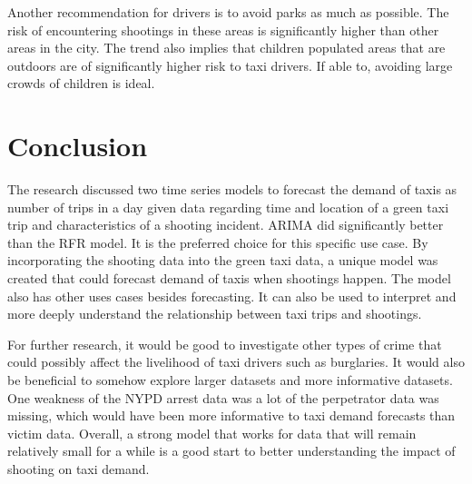 \documentclass[11pt]{article}
\begin{document}
Another recommendation for drivers is to avoid parks as much as possible. The risk of encountering shootings in these areas is significantly higher than other areas in the city. The trend also implies that children populated areas that are outdoors are of significantly higher risk to taxi drivers. If able to, avoiding large crowds of children is ideal.

\section{Conclusion}
The research discussed two time series models to forecast the demand of taxis as number of trips in a day given data regarding time and location of a green taxi trip and characteristics of a shooting incident. ARIMA did significantly better than the RFR model. It is the preferred choice for this specific use case. By incorporating the shooting data into the green taxi data, a unique model was created that could forecast demand of taxis when shootings happen. The model also has other uses cases besides forecasting. It can also be used to interpret and more deeply understand the relationship between taxi trips and shootings. 

For further research, it would be good to investigate other types of crime that could possibly affect the livelihood of taxi drivers such as burglaries. It would also be beneficial to somehow explore larger datasets and more informative datasets. One weakness of the NYPD arrest data was a lot of the perpetrator data was missing, which would have been more informative to taxi demand forecasts than victim data. Overall, a strong model that works for data that will remain relatively small for a while is a good start to better understanding the impact of shooting on taxi demand.


\clearpage

\printbibliography


\end{document}
